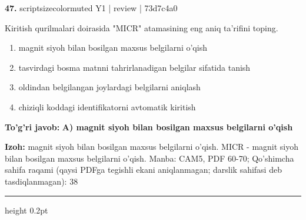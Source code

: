 \documentclass[10pt,a4paper]{article}
\begin{document}
{\bfseries\sffamily\color{ink} 47.} {scriptsizecolor{muted} Y1 | review | 73d7c4a0}
\par
Kiritish qurilmalari doirasida "MICR" atamasining eng aniq ta'rifini toping.
\begin{enumerate}[label=\Alph*),leftmargin=9mm]
\item magnit siyoh bilan bosilgan maxsus belgilarni o'qish
\item tasvirdagi bosma matnni tahrirlanadigan belgilar sifatida tanish
\item oldindan belgilangan joylardagi belgilarni aniqlash
\item chiziqli koddagi identifikatorni avtomatik kiritish
\end{enumerate}
\begin{tcolorbox}[enhanced,breakable,colback=teal!4,colframe=teal!60!black,boxrule=0.45pt,arc=1.2mm,left=2.7mm,right=2.7mm,top=1.8mm,bottom=1.8mm,before skip=2mm,after skip=2mm]
{\bfseries\sffamily\color{teal}To'g'ri javob:} \textbf{A) magnit siyoh bilan bosilgan maxsus belgilarni o'qish}
\par\smallskip
{\bfseries Izoh:} magnit siyoh bilan bosilgan maxsus belgilarni o'qish. MICR - magnit siyoh bilan bosilgan maxsus belgilarni o'qish. Manba: CAM5, PDF 60-70; Qo'shimcha sahifa raqami (qaysi PDFga tegishli ekani aniqlanmagan; darslik sahifasi deb tasdiqlanmagan): 38
\end{tcolorbox}
\vspace{2mm}\hrule height 0.2pt\vspace{3mm}
\end{document}
